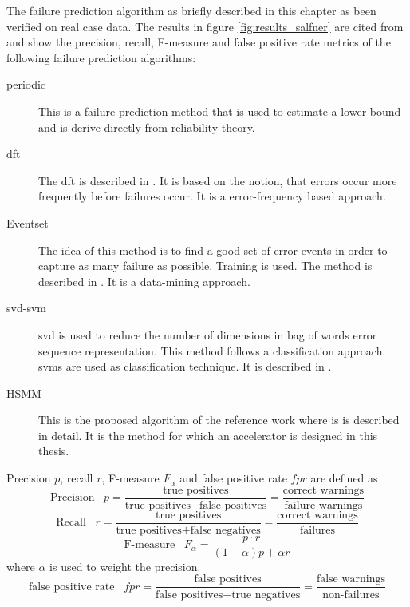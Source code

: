 \documentclass[mscthesis]{usiinfthesis}
\begin{document}
The failure prediction algorithm as briefly described in this chapter as been
verified on real case data. The results in figure \ref{fig:results_salfner} are
cited from \cite{salfner08} and show the precision, recall, F-measure and false
positive rate metrics of the following failure prediction algorithms:
\begin{description}
    \item[periodic] This is a failure prediction method that is used to estimate
        a lower bound and is derive directly from reliability theory.
    \item[\acrshort{dft}] The \acrfull{dft} is described in \cite{lin88}. It is
        based on the notion, that errors occur more frequently before failures
        occur. It is a error-frequency based approach.
    \item[Eventset] The idea of this method is to find
        a good set of error events in order to capture as many failure as
        possible. Training is used. The method is described in
        \cite{ICDM02_Vilalta}. It is a data-mining approach.
    \item[\acrshort{svd}-\acrshort{svm}] \acrfull{svd} is used to reduce the
        number of dimensions in bag of words error sequence representation.
        This method follows a classification approach. \glspl{svm} are used
        as classification technique. It is described in \cite{domeniconi02}.
    \item[HSMM] This is the proposed algorithm of the reference work
        \cite{salfner08} where is is described in detail. It is the method for
        which an accelerator is designed in this thesis.
\end{description}
Precision $p$, recall $r$, F-measure $F_\alpha$ and false positive rate $fpr$
are defined as
\begin{equation}
    \text{Precision} \;\;\; p = \frac{\text{true positives}}{\text{true positives}
        +\text{false positives}}
        = \frac{\text{correct warnings}}{\text{failure warnings}}
\end{equation}
\begin{equation}
    \text{Recall} \;\;\; r = \frac{\text{true positives}}{\text{true positives}
        +\text{false negatives}}
        = \frac{\text{correct warnings}}{\text{failures}}
\end{equation}
\begin{equation}
    \text{F-measure} \;\;\; F_{\alpha} = \frac{p \cdot r}{(1-\alpha)p + \alpha r}
\end{equation}
where $\alpha$ is used to weight the precision.
\begin{equation}
    \text{false positive rate} \;\;\; fpr
        = \frac{\text{false positives}}{\text{false positives}
            +\text{true negatives}}
        = \frac{\text{false warnings}}{\text{non-failures}}
\end{equation}
\end{document}
